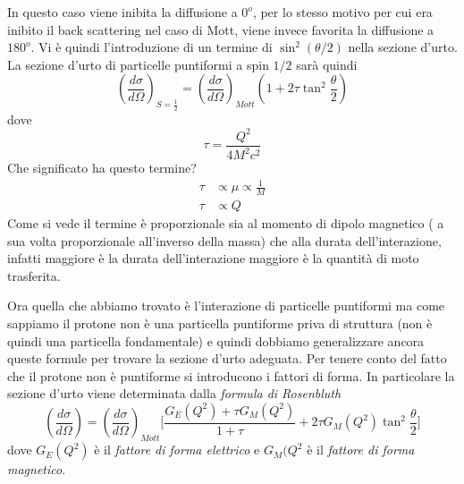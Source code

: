 In questo caso viene inibita la diffusione a $0^o$, per lo stesso motivo per cui era inibito il back scattering nel caso di Mott, viene invece favorita la diffusione a $180^o$.
Vi è quindi l'introduzione di un termine di $\sin^2(\theta/2)$ nella sezione d'urto.
La sezione d'urto di particelle puntiformi a spin $1/2$ sarà quindi 
\begin{equation}
\left(\frac{d\sigma}{d\Omega}\right)_{S=\frac{1}{2}}=\left(\frac{d\sigma}{d\Omega} \right)_{Mott}\left(1+2\tau \tan^2 \frac{\theta}{2}\right)
\end{equation}
dove 
\begin{equation}
\tau=\frac{Q^2}{4M^2c^2}
\end{equation}
Che significato ha questo termine?
\begin{equation}
\begin{split}
\tau &\propto \mu \propto\frac{1}{M}\\
\tau &\propto Q
\end{split}
\end{equation}
Come si vede il termine è proporzionale sia al momento  di dipolo magnetico ( a sua volta proporzionale all'inverso della massa) che alla durata dell'interazione, infatti maggiore è la durata dell'interazione maggiore è la quantità di moto trasferita.

Ora quella che abbiamo trovato è l'interazione di particelle puntiformi ma come sappiamo il protone non è una particella puntiforme priva di struttura (non è quindi una particella fondamentale) e quindi dobbiamo generalizzare ancora queste formule per trovare la sezione d'urto adeguata.
Per tenere conto del fatto che il protone non è puntiforme si introducono i fattori di forma.
In particolare la sezione d'urto viene determinata dalla \emph{formula di Rosenbluth}
\begin{equation}
\left(\frac{d\sigma}{d\Omega}\right)=\left(\frac{d\sigma}{d\Omega}\right)_{Mott}\biggl[ \frac{G_E(Q^2)+\tau G_M(Q^2)}{1+\tau}+2\tau G_M(Q^2)\tan^2\frac{\theta}{2}\biggl]
\label{D:1.4}
\end{equation}
dove $G_E(Q^2)$ è il \emph{fattore di forma elettrico} e $G_M(Q^2$ è il \emph{fattore di forma magnetico}.

